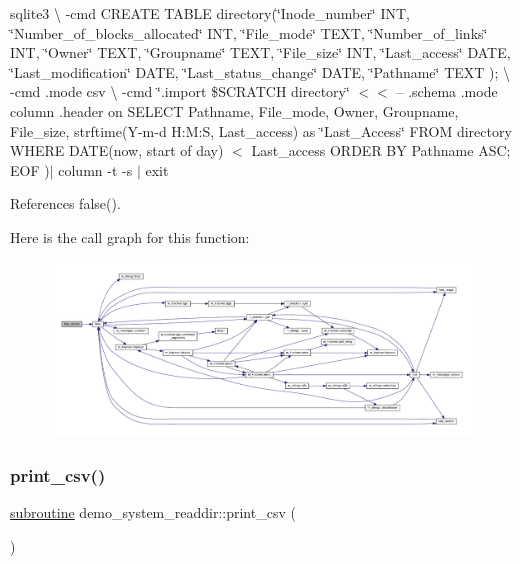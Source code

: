 sqlite3 \textbackslash{} -\/cmd \textquotesingle{}C\+R\+E\+A\+TE T\+A\+B\+LE directory(\char`\"{}\+Inode\+\_\+number\char`\"{} I\+NT, \char`\"{}\+Number\+\_\+of\+\_\+blocks\+\_\+allocated\char`\"{} I\+NT, \char`\"{}\+File\+\_\+mode\char`\"{} T\+E\+XT, \char`\"{}\+Number\+\_\+of\+\_\+links\char`\"{} I\+NT, \char`\"{}\+Owner\char`\"{} T\+E\+XT, \char`\"{}\+Groupname\char`\"{} T\+E\+XT, \char`\"{}\+File\+\_\+size\char`\"{} I\+NT, \char`\"{}\+Last\+\_\+access\char`\"{} D\+A\+TE, \char`\"{}\+Last\+\_\+modification\char`\"{} D\+A\+TE, \char`\"{}\+Last\+\_\+status\+\_\+change\char`\"{} D\+A\+TE, \char`\"{}\+Pathname\char`\"{} T\+E\+XT );\textquotesingle{} \textbackslash{} -\/cmd \textquotesingle{}.mode csv\textquotesingle{} \textbackslash{} -\/cmd \char`\"{}.\+import \$\+S\+C\+R\+A\+T\+C\+H directory\char`\"{} $<$$<$ -- .schema .mode column .header on S\+E\+L\+E\+CT Pathname, File\+\_\+mode, Owner, Groupname, File\+\_\+size, strftime(\textquotesingle{}Y-\/m-\/d H\+:M\+:S\textquotesingle{}, Last\+\_\+access) as \char`\"{}\+Last\+\_\+\+Access\char`\"{} F\+R\+OM directory W\+H\+E\+RE D\+A\+TE(\textquotesingle{}now\textquotesingle{}, \textquotesingle{}start of day\textquotesingle{}) $<$ Last\+\_\+access O\+R\+D\+ER BY Pathname A\+SC; E\+OF )$\vert$ column -\/t -\/s \textquotesingle{}$\vert$\textquotesingle{} exit 

References false().

Here is the call graph for this function\+:
\nopagebreak
\begin{figure}[H]
\begin{center}
\leavevmode
\includegraphics[width=350pt]{__ls_8f90_a39c21619b08a3c22f19e2306efd7f766_cgraph}
\end{center}
\end{figure}
\mbox{\label{__ls_8f90_a4299f4bb3561e562301b7fed91e7c673}} 
\subsubsection{\texorpdfstring{print\+\_\+csv()}{print\_csv()}}
{\footnotesize\ttfamily \hyperlink{M__stopwatch_83_8txt_acfbcff50169d691ff02d4a123ed70482}{subroutine} demo\+\_\+system\+\_\+readdir\+::print\+\_\+csv (\begin{DoxyParamCaption}{ }\end{DoxyParamCaption})}



